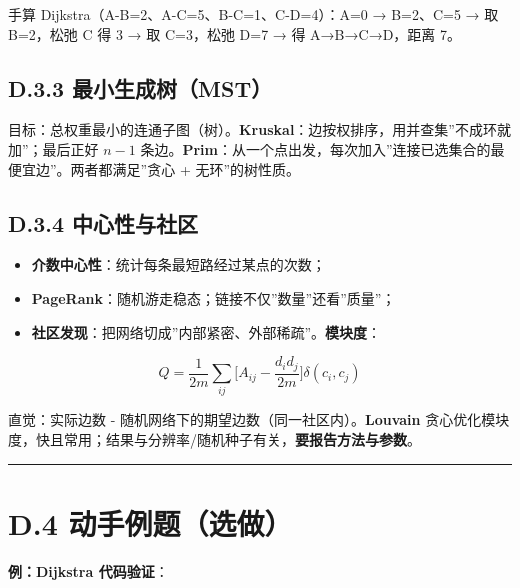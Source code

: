 手算 Dijkstra（A-B=2、A-C=5、B-C=1、C-D=4）：A=0 → B=2、C=5 → 取
B=2，松弛 C 得 3 → 取 C=3，松弛 D=7 → 得 A→B→C→D，距离 7。

\subsection{D.3.3
最小生成树（MST）}\label{d.3.3-ux6700ux5c0fux751fux6210ux6811mst}

目标：总权重最小的连通子图（树）。\textbf{Kruskal}：边按权排序，用并查集''不成环就加''；最后正好
\(n-1\)
条边。\textbf{Prim}：从一个点出发，每次加入''连接已选集合的最便宜边''。两者都满足''贪心
+ 无环''的树性质。

\subsection{D.3.4
中心性与社区}\label{d.3.4-ux4e2dux5fc3ux6027ux4e0eux793eux533a}

\begin{itemize}
\tightlist
\item
  \textbf{介数中心性}：统计每条最短路经过某点的次数；
\item
  \textbf{PageRank}：随机游走稳态；链接不仅''数量''还看''质量''；
\item
  \textbf{社区发现}：把网络切成''内部紧密、外部稀疏''。\textbf{模块度}：
\end{itemize}

\[Q=\frac{1}{2m}\sum_{ij}\Big[A_{ij}-\frac{d_i d_j}{2m}\Big]\delta(c_i,c_j)\]

直觉：实际边数 - 随机网络下的期望边数（同一社区内）。\textbf{Louvain}
贪心优化模块度，快且常用；结果与分辨率/随机种子有关，\textbf{要报告方法与参数}。

\begin{center}\rule{0.5\linewidth}{0.5pt}\end{center}

\section{D.4
动手例题（选做）}\label{d.4-ux52a8ux624bux4f8bux9898ux9009ux505a}

\textbf{例：Dijkstra 代码验证}：

